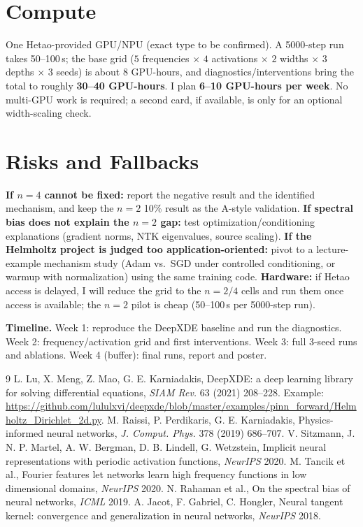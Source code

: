 \documentclass[10pt]{article}
\begin{document}
\section{Compute}

One Hetao-provided GPU/NPU (exact type to be confirmed). A 5000-step run takes 50--100\,s; the base grid ($5$ frequencies $\times$ $4$ activations $\times$ $2$ widths $\times$ $3$ depths $\times$ $3$ seeds) is about 8 GPU-hours, and diagnostics/interventions bring the total to roughly \textbf{30--40 GPU-hours}. I plan \textbf{6--10 GPU-hours per week}. No multi-GPU work is required; a second card, if available, is only for an optional width-scaling check.

\section{Risks and Fallbacks}

\textbf{If $n=4$ cannot be fixed:} report the negative result and the identified mechanism, and keep the $n=2$ 10\% result as the A-style validation. \textbf{If spectral bias does not explain the $n=2$ gap:} test optimization/conditioning explanations (gradient norms, NTK eigenvalues, source scaling). \textbf{If the Helmholtz project is judged too application-oriented:} pivot to a lecture-example mechanism study (Adam vs.\ SGD under controlled conditioning, or warmup with normalization) using the same training code. \textbf{Hardware:} if Hetao access is delayed, I will reduce the grid to the $n=2/4$ cells and run them once access is available; the $n=2$ pilot is cheap (50--100\,s per 5000-step run).

\textbf{Timeline.} Week 1: reproduce the DeepXDE baseline and run the diagnostics. Week 2: frequency/activation grid and first interventions. Week 3: full 3-seed runs and ablations. Week 4 (buffer): final runs, report and poster.

\begin{thebibliography}{9}
\small
\setlength{\itemsep}{0pt}
 L. Lu, X. Meng, Z. Mao, G. E. Karniadakis, DeepXDE: a deep learning library for solving differential equations, \emph{SIAM Rev.} 63 (2021) 208--228. Example: \url{https://github.com/lululxvi/deepxde/blob/master/examples/pinn_forward/Helmholtz_Dirichlet_2d.py}.
 M. Raissi, P. Perdikaris, G. E. Karniadakis, Physics-informed neural networks, \emph{J. Comput. Phys.} 378 (2019) 686--707.
 V. Sitzmann, J. N. P. Martel, A. W. Bergman, D. B. Lindell, G. Wetzstein, Implicit neural representations with periodic activation functions, \emph{NeurIPS} 2020.
 M. Tancik et al., Fourier features let networks learn high frequency functions in low dimensional domains, \emph{NeurIPS} 2020.
 N. Rahaman et al., On the spectral bias of neural networks, \emph{ICML} 2019.
 A. Jacot, F. Gabriel, C. Hongler, Neural tangent kernel: convergence and generalization in neural networks, \emph{NeurIPS} 2018.
\end{thebibliography}
\end{document}
